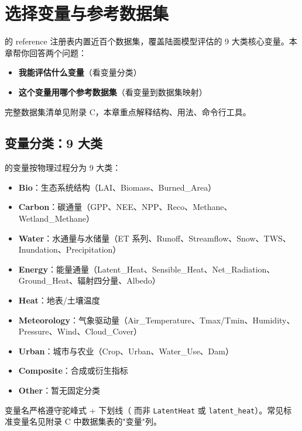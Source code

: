 
\chapter{选择变量与参考数据集}

\openbench{} 的 reference 注册表内置近百个数据集，覆盖陆面模型评估的 9 大类核心变量。本章帮你回答两个问题：

\begin{itemize}
  \item \textbf{我能评估什么变量}（看变量分类）
  \item \textbf{这个变量用哪个参考数据集}（看变量到数据集映射）
\end{itemize}

完整数据集清单见附录 C，本章重点解释结构、用法、命令行工具。

\section{变量分类：9 大类}

\openbench{} 的变量按物理过程分为 9 大类：

\begin{itemize}
  \item \textbf{Bio}：生态系统结构（LAI、Biomass、Burned\_Area）
  \item \textbf{Carbon}：碳通量（GPP、NEE、NPP、Reco、Methane、Wetland\_Methane）
  \item \textbf{Water}：水通量与水储量（ET 系列、Runoff、Streamflow、Snow、TWS、Inundation、Precipitation）
  \item \textbf{Energy}：能量通量（Latent\_Heat、Sensible\_Heat、Net\_Radiation、Ground\_Heat、辐射四分量、Albedo）
  \item \textbf{Heat}：地表/土壤温度
  \item \textbf{Meteorology}：气象驱动量（Air\_Temperature、Tmax/Tmin、Humidity、Pressure、Wind、Cloud\_Cover）
  \item \textbf{Urban}：城市与农业（Crop、Urban、Water\_Use、Dam）
  \item \textbf{Composite}：合成或衍生指标
  \item \textbf{Other}：暂无固定分类
\end{itemize}

变量名严格遵守驼峰式 + 下划线（ 而非 \texttt{LatentHeat} 或 \texttt{latent\_heat}）。常见标准变量名见附录 C 中数据集表的"变量"列。

